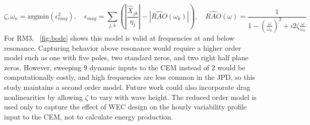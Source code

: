 \documentclass[10pt,twoside]{article}
\begin{document}
\begin{equation}\label{eq:bode-fit}
    \zeta,\omega_n = \mathrm{argmin}(\epsilon_{mag}^2)
    ,\quad
    \epsilon_{mag} = \sum_{j,k}^{} \left(\left|\frac{\hat{X}_{jk}}{\eta_j}\right|-\left|\widehat{RAO}(\omega_k)\right|\right)
    ,\quad
    \widehat{RAO}(\omega) = \frac{1}{1-\left(\frac{\omega}{\omega_n}\right)^2 + i 2 \zeta \frac{\omega}{\omega_n}}
\end{equation}
For RM3, \figureautorefname~\ref{fig:bode} shows this model is valid at frequencies at and below resonance.
Capturing behavior above resonance would require a higher order model such as one with five poles, two standard zeros, and two right half plane zeros.
However, sweeping 9 dynamic inputs to the CEM instead of 2 would be computationally costly, and high frequencies are less common in the JPD, so this study maintains a second order model.
Future work could also incorporate drag nonlinearities by allowing $\zeta$ to vary with wave height.
The reduced order model is used only to capture the effect of WEC design on the hourly variability profile input to the CEM, not to calculate energy production.

\end{document}
